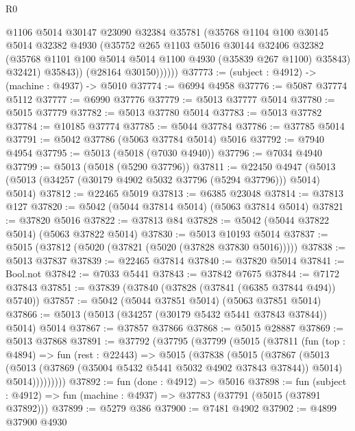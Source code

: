 \begin{lexlean}{R0}
\begin{coremodule}
                @1106
                @5014
                @30147
                @23090
                @32384
                @35781
                (@35768
                  @1104
                  @100
                  @30145
                  @5014
                  @32382
                  @4930
                  (@35752
                    @265
                    @1103
                    @5016
                    @30144
                    @32406
                    @32382
                    (@35768 @1101 @100 @5014 @5014 @1100 @4930 (@35839 @267 @1100) @35843)
                    @32421)
                  @35843))
              (@28164 @30150))))))
@37773 := (subject : @4912) -> (machine : @4937) -> @5010
@37774 := @6994 @4958
@37776 := @5087 @37774 @5112
@37777 := @6990 @37776
@37779 := @5013 @37777 @5014
@37780 := @5015 @37779
@37782 := @5013 @37780 @5014
@37783 := @5013 @37782
@37784 := @10185 @37774
@37785 := @5044 @37784
@37786 := @37785 @5014
@37791 := @5042 @37786 (@5063 @37784 @5014) @5016
@37792 := @7940 @4954
@37795 := @5013 (@5018 (@7030 @4940))
@37796 := @7034 @4940
@37799 := @5013 (@5018 (@5290 @37796))
@37811 := @22450
    @4947
    (@5013 (@5013 (@34257 (@30179 @4902 @5032 @37796 (@5294 @37796))) @5014) @5014)
@37812 := @22465 @5019
@37813 := @6385 @23048
@37814 := @37813 @127
@37820 := @5042 (@5044 @37814 @5014) (@5063 @37814 @5014)
@37821 := @37820 @5016
@37822 := @37813 @84
@37828 := @5042 (@5044 @37822 @5014) (@5063 @37822 @5014)
@37830 := @5013 @10193 @5014
@37837 := @5015 (@37812 (@5020 (@37821 (@5020 (@37828 @37830 @5016)))))
@37838 := @5013 @37837
@37839 := @22465 @37814
@37840 := @37820 @5014
@37841 := Bool.not
@37842 := @7033 @5441
@37843 := @37842 @7675
@37844 := @7172 @37843
@37851 := @37839 (@37840 (@37828 (@37841 (@6385 @37844 @494)) @5740))
@37857 := @5042 (@5044 @37851 @5014) (@5063 @37851 @5014)
@37866 := @5013 (@5013 (@34257 (@30179 @5432 @5441 @37843 @37844)) @5014) @5014
@37867 := @37857 @37866
@37868 := @5015 @28887
@37869 := @5013 @37868
@37891 := @37792
    (@37795
      (@37799
        (@5015
          (@37811
            (fun (top : @4894) =>
            fun (rest : @22443) =>
            @5015
              (@37838
                (@5015
                  (@37867
                    (@5013
                      (@5013 (@37869 (@35004 @5432 @5441 @5032 @4902 @37843 @37844)) @5014)
                      @5014)))))))))
@37892 := fun (done : @4912) => @5016
@37898 := fun (subject : @4912) => fun (machine : @4937) => @37783 (@37791 (@5015 (@37891 @37892)))
@37899 := @5279 @386
@37900 := @7481 @4902
@37902 := @4899 @37900 @4930

\end{coremodule}
\end{lexlean}
